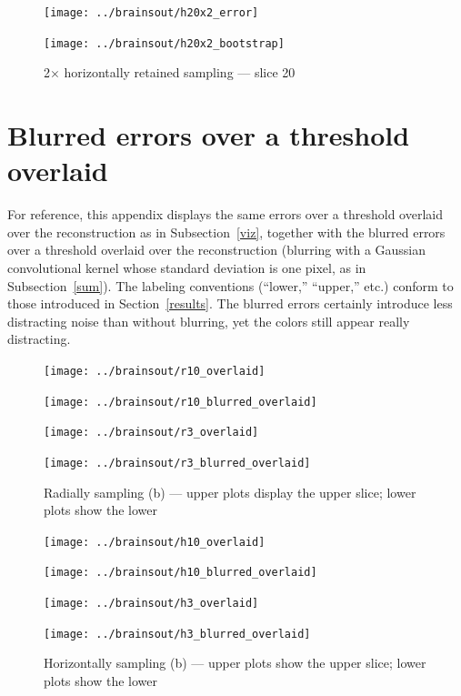 \documentclass[article]{jdssv}
\begin{document}
\begin{appendix}
\begin{figure}
\begin{centering}
\parbox{\imsize}{\texttt{[image: ../brainsout/h20x2\_error]}}
\parbox{\imsize}{\texttt{[image: ../brainsout/h20x2\_bootstrap]}}

\end{centering}
\caption{2$\times$ horizontally retained sampling --- slice 20}
\end{figure}



\clearpage



\section{Blurred errors over a threshold overlaid}
\label{blurredover}

For reference, this appendix displays the same errors over a threshold overlaid
over the reconstruction as in Subsection~\ref{viz},
together with the blurred errors over a threshold overlaid
over the reconstruction (blurring with a Gaussian convolutional kernel
whose standard deviation is one pixel, as in Subsection~\ref{sum}).
The labeling conventions (``lower,'' ``upper,'' etc.)
conform to those introduced in Section~\ref{results}.
The blurred errors certainly introduce less distracting noise
than without blurring, yet the colors still appear really distracting.


\begin{figure}
\begin{centering}

\parbox{\imsizes}{\texttt{[image: ../brainsout/r10\_overlaid]}}
\hfill
\parbox{\imsizes}{\texttt{[image: ../brainsout/r10\_blurred\_overlaid]}}

\vspace{\vertsep}

\parbox{\imsizes}{\texttt{[image: ../brainsout/r3\_overlaid]}}
\hfill
\parbox{\imsizes}{\texttt{[image: ../brainsout/r3\_blurred\_overlaid]}}

\end{centering}
\caption{Radially sampling (b)
--- upper plots display the upper slice; lower plots show the lower}
\end{figure}


\begin{figure}
\begin{centering}

\parbox{\imsizes}{\texttt{[image: ../brainsout/h10\_overlaid]}}
\hfill
\parbox{\imsizes}{\texttt{[image: ../brainsout/h10\_blurred\_overlaid]}}

\vspace{\vertsep}

\parbox{\imsizes}{\texttt{[image: ../brainsout/h3\_overlaid]}}
\hfill
\parbox{\imsizes}{\texttt{[image: ../brainsout/h3\_blurred\_overlaid]}}

\end{centering}
\caption{Horizontally sampling (b)
--- upper plots show the upper slice; lower plots show the lower}
\end{figure}

\end{appendix}
\newpage
\end{document}
